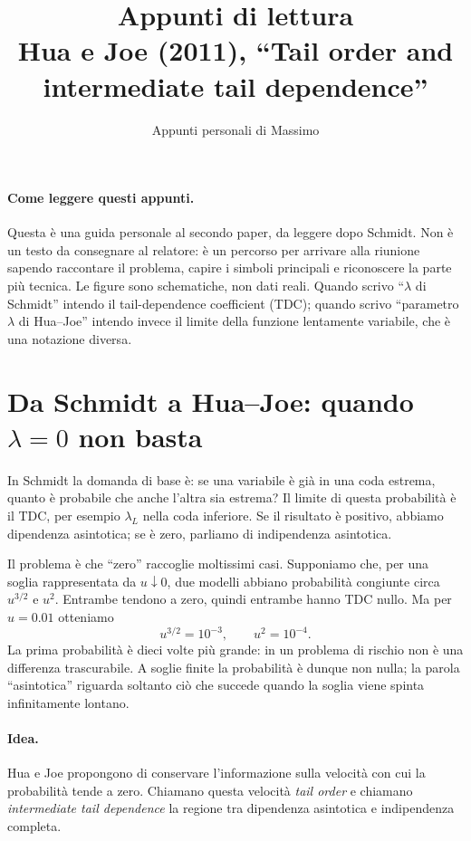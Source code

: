 \documentclass[11pt,a4paper]{article}
\title{Appunti di lettura\\\large Hua e Joe (2011), ``Tail order and intermediate tail dependence''}
\author{Appunti personali di Massimo}
\date{}
\newcommand{\Idea}{\paragraph{Idea.}}
\begin{document}
\maketitle

\paragraph{Come leggere questi appunti.}
Questa è una guida personale al secondo paper, da leggere dopo Schmidt. Non è
un testo da consegnare al relatore: è un percorso per arrivare alla riunione
sapendo raccontare il problema, capire i simboli principali e riconoscere la
parte più tecnica. Le figure sono schematiche, non dati reali. Quando scrivo
``$\lambda$ di Schmidt'' intendo il tail-dependence coefficient (TDC); quando
scrivo ``parametro $\lambda$ di Hua--Joe'' intendo invece il limite della
funzione lentamente variabile, che è una notazione diversa.

\section{Da Schmidt a Hua--Joe: quando $\lambda=0$ non basta}

In Schmidt la domanda di base è: se una variabile è già in una coda estrema,
quanto è probabile che anche l'altra sia estrema? Il limite di questa
probabilità è il TDC, per esempio $\lambda_L$ nella coda inferiore. Se il
risultato è positivo, abbiamo dipendenza asintotica; se è zero, parliamo di
indipendenza asintotica.

Il problema è che ``zero'' raccoglie moltissimi casi. Supponiamo che, per una
soglia rappresentata da $u\downarrow0$, due modelli abbiano probabilità
congiunte circa $u^{3/2}$ e $u^2$. Entrambe tendono a zero, quindi entrambe
hanno TDC nullo. Ma per $u=0.01$ otteniamo
\[
  u^{3/2}=10^{-3},\qquad u^2=10^{-4}.
\]
La prima probabilità è dieci volte più grande: in un problema di rischio non è
una differenza trascurabile. A soglie finite la probabilità è dunque non nulla;
la parola ``asintotica'' riguarda soltanto ciò che succede quando la soglia
viene spinta infinitamente lontano.

\Idea Hua e Joe propongono di conservare l'informazione sulla velocità con cui
la probabilità tende a zero. Chiamano questa velocità \emph{tail order} e
chiamano \emph{intermediate tail dependence} la regione tra dipendenza
asintotica e indipendenza completa.
\end{document}
